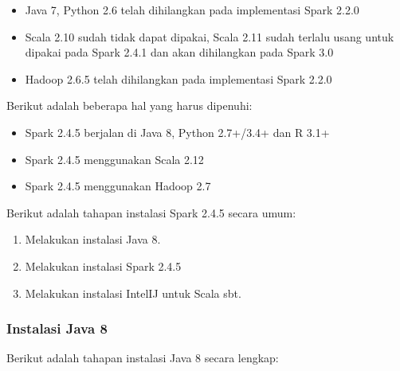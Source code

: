 \begin{itemize}
\item Java 7, Python 2.6 telah dihilangkan pada implementasi Spark 2.2.0
\item Scala 2.10 sudah tidak dapat dipakai, Scala 2.11 sudah terlalu usang untuk dipakai pada Spark 2.4.1 dan akan dihilangkan pada Spark 3.0
\item Hadoop 2.6.5 telah dihilangkan pada implementasi Spark 2.2.0 
\end{itemize}

\noindent Berikut adalah beberapa hal yang harus dipenuhi:

\begin{itemize}
\item Spark 2.4.5 berjalan di Java 8, Python 2.7+/3.4+ dan R 3.1+ 
\item Spark 2.4.5 menggunakan Scala 2.12
\item Spark 2.4.5 menggunakan Hadoop 2.7
\end{itemize}

\noindent Berikut adalah tahapan instalasi Spark 2.4.5 secara umum:

\begin{enumerate}
\item Melakukan instalasi Java 8.
\item Melakukan instalasi Spark 2.4.5
\item Melakukan instalasi IntelIJ untuk Scala sbt.
\end{enumerate}

\newpage
\subsubsection{Instalasi Java 8}
\noindent Berikut adalah tahapan instalasi Java 8 secara lengkap:

